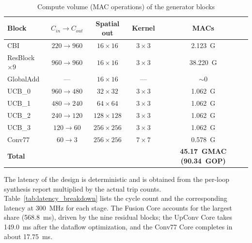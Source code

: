 \begin{table}[H]
    \centering
    \caption{Compute volume (MAC operations) of the generator blocks}
    \label{tab:compute_volume}
    \small
    \renewcommand{\arraystretch}{1.2}
    \begin{tabular}{|l|c|c|c|c|}
        \hline
        \textbf{Block} & \textbf{$C_{in}\rightarrow C_{out}$} & \textbf{Spatial out} & \textbf{Kernel} & \textbf{MACs} \\
        \hline
        CBI & $220\rightarrow960$ & $16\times16$ & $3\times3$ & 2.123~G \\
        \hline
        ResBlock $\times 9$ & $960\rightarrow960$ & $16\times16$ & $3\times3$ & 38.220~G \\
        \hline
        GlobalAdd & --- & $16\times16$ & --- & $\sim0$ \\
        \hline
        UCB\_0 & $960\rightarrow480$ & $32\times32$ & $3\times3$ & 1.062~G \\
        \hline
        UCB\_1 & $480\rightarrow240$ & $64\times64$ & $3\times3$ & 1.062~G \\
        \hline
        UCB\_2 & $240\rightarrow120$ & $128\times128$ & $3\times3$ & 1.062~G \\
        \hline
        UCB\_3 & $120\rightarrow60$ & $256\times256$ & $3\times3$ & 1.062~G \\
        \hline
        Conv77 & $60\rightarrow3$ & $256\times256$ & $7\times7$ & 0.578~G \\
        \hline
        \textbf{Total} & & & & \textbf{45.17~GMAC (90.34~GOP)} \\
        \hline
    \end{tabular}
\end{table}

The latency of the design is deterministic and is obtained from the per-loop synthesis report multiplied by the actual trip counts. Table~\ref{tab:latency_breakdown} lists the cycle count and the corresponding latency at 300~MHz for each stage. The Fusion Core accounts for the largest share (568.8~ms), driven by the nine residual blocks; the UpConv Core takes 149.0~ms after the dataflow optimization, and the Conv77 Core completes in about 17.75~ms.

